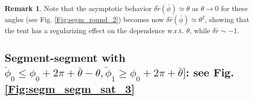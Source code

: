 \documentclass[reqno]{amsart}
\theoremstyle{definition} \newtheorem{definition}{Definition}[section]
\theoremstyle{definition} \newtheorem{remark}[definition]{Remark}
\theoremstyle{plain} \newtheorem{lemma}[definition]{Lemma}
\theoremstyle{plain} \newtheorem{proposition}[definition]{Proposition}
\theoremstyle{plain} \newtheorem{theorem}[definition]{Theorem}
\theoremstyle{plain} \newtheorem{corollary}[definition]{Corollary}
\theoremstyle{definition} \newtheorem{example}[definition]{Example}
\theoremstyle{plain} \newtheorem{claim}[clai]{Claim}
\theoremstyle{definition} \newtheorem{assumption}[definition]{Assumption}
\theoremstyle{definition} \newtheorem{observation}[definition]{Observation}
\newcommand{\1}{\mathbbm 1}
\numberwithin{equation}{section} %
\theoremstyle{plain} \newtheorem*{theorem*}{Theorem}
\theoremstyle{plain} \newtheorem{mthm}[maintheorem]{Main Theorem}
\theoremstyle{plain} \newtheorem*{mthm*}{Main Theorem}
\theoremstyle{plain} \newtheorem*{conjecture*}{Conjecture}
\theoremstyle{plain} \newtheorem{conjecture}[definition]{Conjecture}
\theoremstyle{plain} \newtheorem*{problem*}{Problem}
\begin{document}
\begin{remark}
\label{Rem:more_regu}
Note that the asymptotic behavior $\delta \tilde r(\bar \phi) \simeq \theta$ as $\theta \to 0$ for these angles (see Fig. \ref{Fig:segm_round_2}) becomes now $\delta \hat r(\bar \phi) \simeq \theta^2$, showing that the tent has a regularizing effect on the dependence w.r.t. $\theta$, while $\delta \tilde r \sim -1$.
\end{remark}

%
%
%
%


\subsection{Segment-segment with \texorpdfstring{$\check \phi_0 \leq \phi_0 + 2\pi + \bar \theta - \theta, \check \phi_1 \geq \phi_0 + 2\pi + \bar \theta]$}{check phi0 leq phi0 + 2pi + bar theta - theta, check phi1 geq phi0 + 2pi + bar theta]}: see Fig. \ref{Fig:segm_segm_sat_3}}
\label{Sss:segm_semg_after_neg_3}
\end{document}
